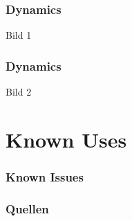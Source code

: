 \documentclass{beamer}
\begin{document}
\begin{frame}
 \frametitle{Dynamics}
 Bild 1
 
 
\end{frame}

\begin{frame}
 \frametitle{Dynamics}
 Bild 2
 
 
\end{frame}

\section{Known Uses}

\begin{frame}
 \frametitle{Known Issues}
 
\end{frame}

\begin{frame}
 \frametitle{Quellen}

 
\end{frame}
\end{document}
